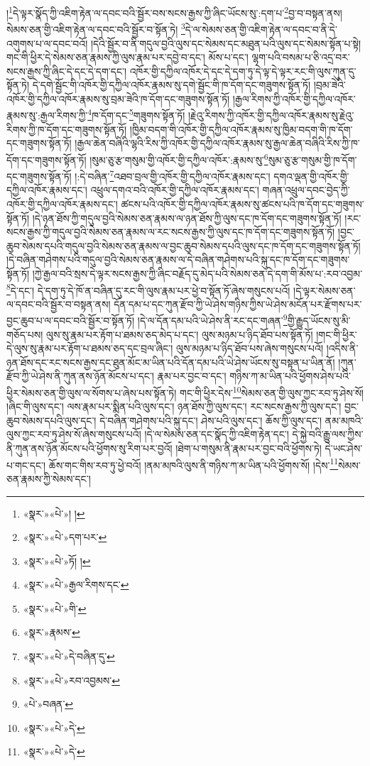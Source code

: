 །\footnote{«སྣར་»«པེ་»། །}དེ་ལྟར་སྣོད་ཀྱི་འཇིག་རྟེན་ལ་དབང་བའི་སྦྱོར་བས་སངས་རྒྱས་ཀྱི་ཞིང་ཡོངས་སུ་:དག་པ་\footnote{«སྣར་»«པེ་»དག་པར་}བྱ་བ་བསྟན་ནས། སེམས་ཅན་གྱི་འཇིག་རྟེན་ལ་དབང་བའི་སྦྱོར་བ་སྟོན་ཏེ། \footnote{«སྣར་»«པེ་»ཏོ། ། }དེ་ལ་སེམས་ཅན་གྱི་འཇིག་རྟེན་ལ་དབང་བ་ནི་དེ་འགུགས་པ་ལ་དབང་བའོ། །དེའི་སྦྱོར་བ་ནི་གདུལ་བྱའི་ལུས་དང་སེམས་དང་མཐུན་པའི་ལུས་དང་སེམས་སྟོན་པ་སྟེ། གང་གི་ཕྱིར་དེ་སེམས་ཅན་རྣམས་ཀྱི་ལུས་རྣམ་པར་དབྱེ་བ་དང་། མོས་པ་དང་། ལྷག་པའི་བསམ་པ་ཅི་འདྲ་བར་སངས་རྒྱས་ཀྱི་ཞིང་དེ་དང་དེ་དག་དང་། འཁོར་གྱི་དཀྱིལ་འཁོར་དེ་དང་དེ་དག་ཏུ་དེ་ལྟ་དེ་ལྟར་རང་གི་ལུས་ཀུན་དུ་སྟོན་ཏེ། དེ་དགེ་སྦྱོང་གི་འཁོར་གྱི་དཀྱིལ་འཁོར་རྣམས་སུ་དགེ་སྦྱོང་གི་ཁ་དོག་དང་གཟུགས་སྟོན་ཏོ། །བྲམ་ཟེའི་འཁོར་གྱི་དཀྱིལ་འཁོར་རྣམས་སུ་བྲམ་ཟེའི་ཁ་དོག་དང་གཟུགས་སྟོན་ཏོ། །རྒྱལ་རིགས་ཀྱི་འཁོར་གྱི་དཀྱིལ་འཁོར་རྣམས་སུ་:རྒྱལ་རིགས་ཀྱི་\footnote{«སྣར་»«པེ་»རྒྱལ་རིགས་དང་}ཁ་དོག་དང་\footnote{«སྣར་»«པེ་»གི་}གཟུགས་སྟོན་ཏོ། །རྗེའུ་རིགས་ཀྱི་འཁོར་གྱི་དཀྱིལ་འཁོར་རྣམས་སུ་རྗེའུ་རིགས་ཀྱི་ཁ་དོག་དང་གཟུགས་སྟོན་ཏོ། །ཁྱིམ་བདག་གི་འཁོར་གྱི་དཀྱིལ་འཁོར་རྣམས་སུ་ཁྱིམ་བདག་གི་ཁ་དོག་དང་གཟུགས་སྟོན་ཏོ། །རྒྱལ་ཆེན་བཞིའི་ལྷའི་རིས་ཀྱི་འཁོར་གྱི་དཀྱིལ་འཁོར་རྣམས་སུ་རྒྱལ་ཆེན་བཞིའི་རིས་ཀྱི་ཁ་དོག་དང་གཟུགས་སྟོན་ཏོ། །སུམ་ཅུ་རྩ་གསུམ་གྱི་འཁོར་གྱི་དཀྱིལ་འཁོར་:རྣམས་སུ་\footnote{«སྣར་»རྣམས་}སུམ་ཅུ་རྩ་གསུམ་གྱི་ཁ་དོག་དང་གཟུགས་སྟོན་ཏོ། །:དེ་བཞིན་\footnote{«སྣར་»«པེ་»དེ་བཞིན་དུ་}འཐབ་བྲལ་གྱི་འཁོར་གྱི་དཀྱིལ་འཁོར་རྣམས་དང་། དགའ་ལྡན་གྱི་འཁོར་གྱི་དཀྱིལ་འཁོར་རྣམས་དང་། འཕྲུལ་དགའ་བའི་འཁོར་གྱི་དཀྱིལ་འཁོར་རྣམས་དང་། གཞན་འཕྲུལ་དབང་བྱེད་ཀྱི་འཁོར་གྱི་དཀྱིལ་འཁོར་རྣམས་དང་། ཚངས་པའི་འཁོར་གྱི་དཀྱིལ་འཁོར་རྣམས་སུ་ཚངས་པའི་ཁ་དོག་དང་གཟུགས་སྟོན་ཏོ། །དེ་ཉན་ཐོས་ཀྱི་གདུལ་བྱའི་སེམས་ཅན་རྣམས་ལ་ཉན་ཐོས་ཀྱི་ལུས་དང་ཁ་དོག་དང་གཟུགས་སྟོན་ཏོ། །རང་སངས་རྒྱས་ཀྱི་གདུལ་བྱའི་སེམས་ཅན་རྣམས་ལ་རང་སངས་རྒྱས་ཀྱི་ལུས་དང་ཁ་དོག་དང་གཟུགས་སྟོན་ཏོ། །བྱང་ཆུབ་སེམས་དཔའི་གདུལ་བྱའི་སེམས་ཅན་རྣམས་ལ་བྱང་ཆུབ་སེམས་དཔའི་ལུས་དང་ཁ་དོག་དང་གཟུགས་སྟོན་ཏོ། །དེ་བཞིན་གཤེགས་པའི་གདུལ་བྱའི་སེམས་ཅན་རྣམས་ལ་དེ་བཞིན་གཤེགས་པའི་སྐུ་དང་ཁ་དོག་དང་གཟུགས་སྟོན་ཏོ། །ཀྱེ་རྒྱལ་བའི་སྲས་དེ་ལྟར་སངས་རྒྱས་ཀྱི་ཞིང་བརྗོད་དུ་མེད་པའི་སེམས་ཅན་དེ་དག་གི་མོས་པ་:རབ་འབྱམ་\footnote{«སྣར་»«པེ་»རབ་འབྱམས་}དེ་དང་། དེ་དག་ཏུ་དེ་ཁོ་ན་བཞིན་དུ་རང་གི་ལུས་རྣམ་པར་ཕྱེ་བ་སྟོན་ཏོ་ཞེས་གསུངས་པའོ། །དེ་ལྟར་སེམས་ཅན་ལ་དབང་བའི་སྦྱོར་བ་བསྟན་ནས། དོན་དམ་པ་དང་ཀུན་རྫོབ་ཀྱི་ཡེ་ཤེས་གཉིས་ཀྱིས་ཡེ་ཤེས་མངོན་པར་རྫོགས་པར་བྱང་ཆུབ་པ་ལ་དབང་བའི་སྦྱོར་བ་སྟོན་ཏོ། །དེ་ལ་དོན་དམ་པའི་ཡེ་ཤེས་ནི་རང་དང་གཞན་\footnote{«པེ་»བཞན་}གྱི་རྒྱུད་ཡོངས་སུ་མི་གཅོད་པས། ལུས་སུ་རྣམ་པར་རྟོག་པ་ཐམས་ཅད་མེད་པ་དང་། ལུས་མཉམ་པ་ཉིད་ཐོབ་པས་སྟོན་ཏོ། །གང་གི་ཕྱིར་དེ་ལུས་སུ་རྣམ་པར་རྟོག་པ་ཐམས་ཅད་དང་བྲལ་ཞིང་། ལུས་མཉམ་པ་ཉིད་ཐོབ་པས་ཞེས་གསུངས་པའོ། །འདིས་ནི་ཉན་ཐོས་དང་རང་སངས་རྒྱས་དང་ཐུན་མོང་མ་ཡིན་པའི་དོན་དམ་པའི་ཡེ་ཤེས་ཡོངས་སུ་བསྟན་པ་ཡིན་ནོ། །ཀུན་རྫོབ་ཀྱི་ཡེ་ཤེས་ནི་ཀུན་ནས་ཉོན་མོངས་པ་དང་། རྣམ་པར་བྱང་བ་དང་། གཉིས་ཀ་མ་ཡིན་པའི་ཕྱོགས་ཤེས་པའི་ཕྱིར་སེམས་ཅན་གྱི་ལུས་ལ་སོགས་པ་ཞེས་པས་སྟོན་ཏེ། གང་གི་ཕྱིར་དེས་\footnote{«སྣར་»«པེ་»དེ་}སེམས་ཅན་གྱི་ལུས་ཀྱང་རབ་ཏུ་ཤེས་སོ། །ཞིང་གི་ལུས་དང་། ལས་རྣམ་པར་སྨིན་པའི་ལུས་དང་། ཉན་ཐོས་ཀྱི་ལུས་དང་། རང་སངས་རྒྱས་ཀྱི་ལུས་དང་། བྱང་ཆུབ་སེམས་དཔའི་ལུས་དང་། དེ་བཞིན་གཤེགས་པའི་སྐུ་དང་། ཤེས་པའི་ལུས་དང་། ཆོས་ཀྱི་ལུས་དང་། ནམ་མཁའི་ལུས་ཀྱང་རབ་ཏུ་ཤེས་སོ་ཞེས་གསུངས་པའོ། །དེ་ལ་སེམས་ཅན་དང་སྣོད་ཀྱི་འཇིག་རྟེན་དང་། དེ་སྐྱེ་བའི་རྒྱུ་ལས་ཀྱིས་ནི་ཀུན་ནས་ཉོན་མོངས་པའི་ཕྱོགས་སུ་རིག་པར་བྱའོ། །ཐེག་པ་གསུམ་ནི་རྣམ་པར་བྱང་བའི་ཕྱོགས་ཏེ། དེ་ཡང་ཤེས་པ་གང་དང་། ཆོས་གང་གིས་རབ་ཏུ་ཕྱེ་བའོ། །ནམ་མཁའི་ལུས་ནི་གཉིས་ཀ་མ་ཡིན་པའི་ཕྱོགས་སོ། །དེས་\footnote{«སྣར་»«པེ་»དེ་}སེམས་ཅན་རྣམས་ཀྱི་སེམས་དང་། 